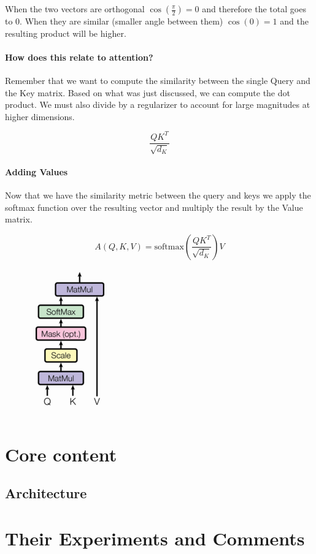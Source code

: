 \documentclass{article}
\begin{document}
    When the two vectors are orthogonal $\cos(\frac{\pi}{2}) = 0$ and therefore the total goes to 0.
    When they are similar (smaller angle between them) $\cos(0) = 1$ and the resulting product will be higher.

    \paragraph{How does this relate to attention?} Remember that we want to compute the similarity between the single Query and the Key matrix. Based on what was just discussed, we can compute the dot product. We must also divide by a regularizer to account for large magnitudes at higher dimensions.

    \[ \frac{QK^T}{\sqrt{d_K}} \]

    \paragraph{Adding Values} Now that we have the similarity metric between the query and keys we apply the softmax function over the resulting vector and multiply the result by the Value matrix.

    \[ A(Q,K,V) = \text{softmax} \left ( \frac{QK^T}{\sqrt{d_K}} \right) V \]

    \begin{center}
        \includegraphics[scale=0.5]{fig3.png}
    \end{center}

    \section{Core content}

    \subsection{Architecture}
    


    \section{Their Experiments and Comments}
\end{document}
